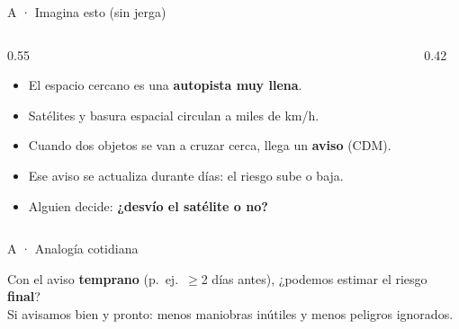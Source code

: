 \documentclass[aspectratio=169,10pt]{beamer}
\begin{document}
\begin{frame}{A · Imagina esto (sin jerga)}
  \begin{columns}[T]
    \begin{column}{0.55\textwidth}
      \begin{itemize}
        \item El espacio cercano es una \textbf{autopista muy llena}.
        \item Satélites y basura espacial circulan a miles de km/h.
        \item Cuando dos objetos se van a cruzar cerca, llega un \textbf{aviso} (CDM).
        \item Ese aviso se actualiza durante días: el riesgo sube o baja.
        \item Alguien decide: \textbf{¿desvío el satélite o no?}
      \end{itemize}
    \end{column}
    \begin{column}{0.42\textwidth}
    \end{column}
  \end{columns}
\end{frame}

\begin{frame}{A · Analogía cotidiana}
  \begin{center}
  \end{center}
  \vspace{0.45em}
  Con el aviso \textbf{temprano} (p.\ ej.\ $\geq$2 días antes), ¿podemos estimar el riesgo \textbf{final}?\\
  Si avisamos bien y pronto: menos maniobras inútiles y menos peligros ignorados.
\end{frame}
\end{document}
